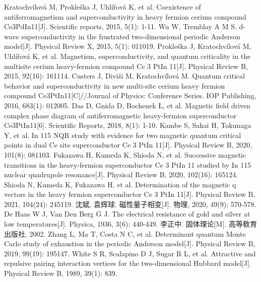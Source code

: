 \begin{thebibliography}{20}
 Kratochvílová M, Prokleška J, Uhlířová K, et al. Coexistence of antiferromagnetism and superconductivity in heavy fermion cerium compound Ce3PdIn11[J]. Scientific reports, 2015, 5(1): 1-11.
 Wu W, Tremblay A M S. d-wave superconductivity in the frustrated two-dimensional periodic Anderson model[J]. Physical Review X, 2015, 5(1): 011019.
 Prokleška J, Kratochvílová M, Uhlířová K, et al. Magnetism, superconductivity, and quantum criticality in the multisite cerium heavy-fermion compound Ce 3 PtIn 11[J]. Physical Review B, 2015, 92(16): 161114.
 Custers J, Diviši M, Kratochvílová M. Quantum critical behavior and superconductivity in new multi-site cerium heavy fermion compound Ce3PtIn11[C]//Journal of Physics: Conference Series. IOP Publishing, 2016, 683(1): 012005.
 Das D, Gnida D, Bochenek Ł, et al. Magnetic field driven complex phase diagram of antiferromagnetic heavy-fermion superconductor Ce3PtIn11[6]. Scientific Reports, 2018, 8(1): 1-10.
 Kambe S, Sakai H, Tokunaga Y, et al. In 115 NQR study with evidence for two magnetic quantum critical points in dual Ce site superconductor Ce 3 PtIn 11[J]. Physical Review B, 2020, 101(8): 081103.
 Fukazawa H, Kumeda K, Shioda N, et al. Successive magnetic transitions in the heavy-fermion superconductor Ce 3 PtIn 11 studied by In 115 nuclear quadrupole resonance[J]. Physical Review B, 2020, 102(16): 165124.
 Shioda N, Kumeda K, Fukazawa H, et al. Determination of the magnetic q vectors in the heavy fermion superconductor Ce 3 PtIn 11[J]. Physical Review B, 2021, 104(24): 245119.
 沈斌, 袁辉球. 磁性量子相变[J]. 物理, 2020, 49(9): 570-578.
 De Haas W J, Van Den Berg G J. The electrical resistance of gold and silver at low temperatures[J]. Physica, 1936, 3(6): 440-449.
 李正中. 固体理论[M]. 高等敎育出版社, 2002.
 Zhang L, Ma T, Costa N C, et al. Determinant quantum Monte Carlo study of exhaustion in the periodic Anderson model[J]. Physical Review B, 2019, 99(19): 195147.
 White S R, Scalapino D J, Sugar R L, et al. Attractive and repulsive pairing interaction vertices for the two-dimensional Hubbard model[J]. Physical Review B, 1989, 39(1): 839.
\end{thebibliography}
